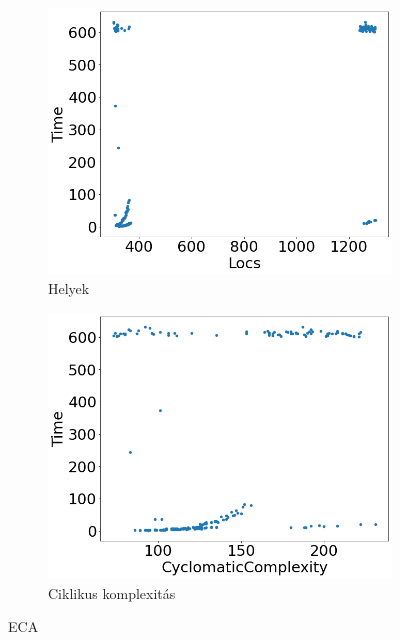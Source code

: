 \begin{figure}[ht]
\begin{subfigure}[b]{0.5\linewidth}
		\includegraphics[width=0.95\linewidth]{figures/eca/locs.png} 
		\caption{Helyek} 
		\label{fig7:c} 
	\end{subfigure}%
	\begin{subfigure}[b]{0.5\linewidth}
		\centering
		\includegraphics[width=0.95\linewidth]{figures/eca/cc.png} 
		\caption{Ciklikus komplexitás} 
		\label{fig7:d} 
	\end{subfigure} 
	\caption{ECA}
	\label{fig_eca} 
\end{figure}